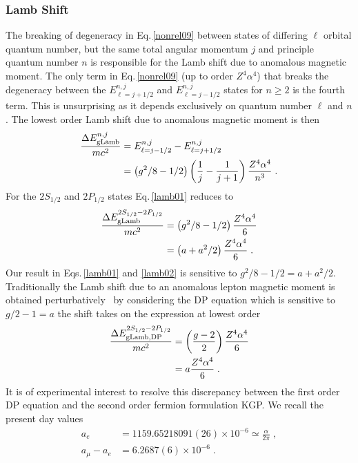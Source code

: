 \subsubsection{Lamb Shift} \label{lamb}
The breaking of degeneracy in Eq.\,\eqref{nonrel09} between states of differing $\ell$ orbital quantum number, but the same total angular momentum $j$ and principle quantum number $n$ is responsible for the Lamb shift due to anomalous magnetic moment. The only term in Eq.\,\eqref{nonrel09} (up to order $Z^{4}\alpha^{4}$) that breaks the degeneracy between the $E^{n,j}_{\ell=j+1/2}$ and $E^{n,j}_{\ell=j-1/2}$ states for $n\geq2$ is the fourth term. This is unsurprising as it depends exclusively on quantum number $\ell$ and $n$. The lowest order Lamb shift due to anomalous magnetic moment is then
\begin{alignat}{1}
\label{lamb01} \frac{\Delta E_{\mathrm{gLamb}}^{n,j}}{mc^{2}}&=E^{n,j}_{\ell=j-1/2}-E^{n,j}_{\ell=j+1/2}\\ \notag &=\left(g^{2}/8-1/2\right)\left(\frac{1}{j}-\frac{1}{j+1}\right)\frac{Z^{4}\alpha^{4}}{n^{3}}\;.
\end{alignat}
For the $2S_{1/2}$ and $2P_{1/2}$ states Eq.\,\eqref{lamb01} reduces to
\begin{alignat}{1}
\label{lamb02} \frac{\Delta E_{\mathrm{gLamb}}^{2S_{1/2}-2P_{1/2}}}{mc^{2}}&=\left(g^{2}/8-1/2\right)\frac{Z^{4}\alpha^{4}}{6}\\ \notag &=\left(a+a^{2}/2\right)\frac{Z^{4}\alpha^{4}}{6}\;.
\end{alignat}
Our result in Eqs.\,\eqref{lamb01} and \eqref{lamb02} is sensitive to $g^{2}/8-1/2=a+a^{2}/2$. Traditionally the Lamb shift due to an anomalous lepton magnetic moment is obtained perturbatively~\citep{Itzykson:1980rh} by considering the DP equation which is sensitive to $g/2-1=a$ the shift takes on the expression at lowest order
\begin{alignat}{1}
\label{lamb03} \frac{\Delta E_{\mathrm{gLamb,DP}}^{2S_{1/2}-2P_{1/2}}}{mc^{2}}&=\left(\frac{g-2}{2}\right)\frac{Z^{4}\alpha^{4}}{6}\\ \notag &=a\frac{Z^{4}\alpha^{4}}{6}\;.
\end{alignat}
It is of experimental interest to resolve this discrepancy between the first order DP equation and the second order fermion formulation KGP. We recall the present day values
\begin{subequations}
\begin{alignat}{1}
\label{aeFULL} a_e&=1159.65218091(26)\times 10^{-6}\simeq \frac{\alpha}{2\pi}\;,\\
a_\mu-a_e&=6.2687(6)\times 10^{-6}\;.
\end{alignat}
\end{subequations}
